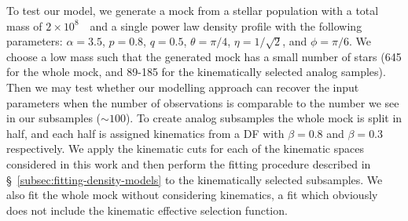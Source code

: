 To test our model, we generate a mock from a stellar population with a total mass of $2\times10^{8}$~\Msun\ and a single power law density profile with the following parameters: $\alpha=3.5$, $p=0.8$, $q=0.5$, $\theta=\pi/4$, $\eta=1/\sqrt{2}$, and $\phi=\pi/6$. We choose a low mass such that the generated mock has a small number of stars (645 for the whole mock, and 89-185 for the kinematically selected \gse analog samples). Then we may test whether our modelling approach can recover the input parameters when the number of observations is comparable to the number we see in our \gse subsamples ($\sim 100$). To create analog \gse subsamples the whole mock is split in half, and each half is assigned kinematics from a DF with $\beta=0.8$ and $\beta=0.3$ respectively. We apply the kinematic cuts for each of the kinematic spaces considered in this work and then perform the fitting procedure described in \S~\ref{subsec:fitting-density-models} to the kinematically selected subsamples. We also fit the whole mock without considering kinematics, a fit which obviously does not include the kinematic effective selection function. 

